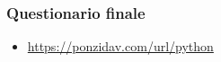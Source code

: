 
\begin{exampleframe}
    \frametitle{Questionario finale}

    \begin{itemize}
        \item \url{https://ponzidav.com/url/python}
    \end{itemize}
\end{exampleframe}
